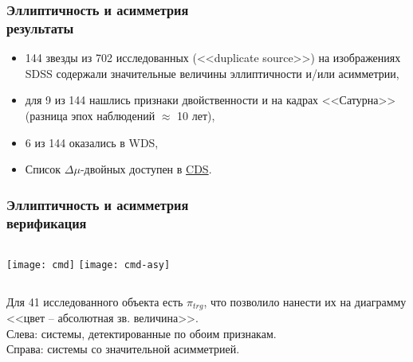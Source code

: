 \begin{frame}
\frametitle{Эллиптичность и асимметрия\\{\small результаты}}
\begin{itemize}
\item 144 звезды из 702 исследованных (<<duplicate source>>) на изображениях SDSS содержали значительные величины эллиптичности и/или асимметрии,
\item для 9 из 144 нашлись признаки двойственности и на кадрах <<Сатурна>> (разница эпох наблюдений $\approx$ 10 лет),
\item 6 из 144 оказались в WDS,
\item Список $\Delta\mu$-двойных доступен в \href{http://vizier.u-strasbg.fr/viz-bin/VizieR?-source=J/PAZh/44/124}{CDS}.
\end{itemize}
\end{frame}

\begin{frame}
\frametitle{Эллиптичность и асимметрия\\{\small верификация}}
\begin{center}
\begin{columns}
	\texttt{[image: cmd]}
	\texttt{[image: cmd-asy]}
\end{columns}
\end{center}
{\footnotesize 
	Для 41 исследованного объекта есть $\pi_{trg}$, что позволило нанести их на диаграмму <<цвет -- абсолютная зв. величина>>.\\ Слева: системы, детектированные по обоим признакам.\\ Справа: системы со значительной асимметрией.
}
\end{frame}





